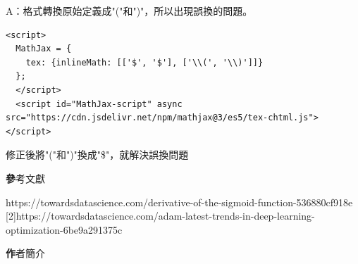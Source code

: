 \documentclass[14pt,a4paper]{report}  %
\begin{document}
A：格式轉換原始定義成"("和")"，所以出現誤換的問題。\\
\begin{lstlisting}
<script>
  MathJax = {
    tex: {inlineMath: [['$', '$'], ['\\(', '\\)']]}
  };
  </script>
  <script id="MathJax-script" async src="https://cdn.jsdelivr.net/npm/mathjax@3/es5/tex-chtml.js"></script>
\end{lstlisting}
修正後將"("和")"換成"\$"，就解決誤換問題
\newpage
\begin{center}
\LARGE\textbf 參考文獻\\
\end{center}
\begin{flushleft}
\begin{Large}
[1]\quad https://towardsdatascience.com/derivative-of-the-sigmoid-function-536880cf918e\\

[2]\quad https://towardsdatascience.com/adam-latest-trends-in-deep-learning-optimization-6be9a291375c\\
\end{Large}
\end{flushleft}
\newpage
\begin{center}
\LARGE\textbf 作者簡介\\
\end{center}

\end{document}
